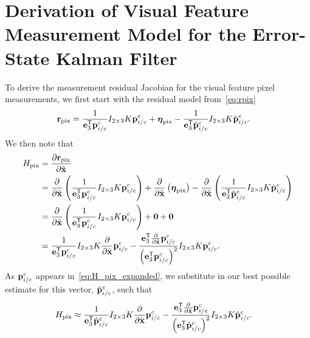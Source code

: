 \section{Derivation of Visual Feature Measurement Model for the Error-State Kalman Filter}
\label{apdx:estimation_pixel_meas_model}

To derive the measurement residual Jacobian for the visual feature pixel measurements, we
first start with the residual model from~\eqref{eq:rpix}
\begin{align}
  \boldsymbol{\mathrm{r}}_{\text{pix}}
  &= \frac{1}{\boldsymbol{\mathrm{e}}_3^{\mathsf{T}} \boldsymbol{\mathrm{p}}_{i/c}^c} I_{2 \times 3} K
  \boldsymbol{\mathrm{p}}_{i/c}^c + \boldsymbol{\mathrm{\eta}}_{\text{pix}} - \frac{1}{\boldsymbol{\mathrm{e}}_3^{\mathsf{T}} \hat{\boldsymbol{\mathrm{p}}}_{i/c}^c} I_{2 \times 3} K
  \hat{\boldsymbol{\mathrm{p}}}_{i/c}^c.
\end{align}
We then note that
\begin{align}
  H_{\text{pix}} &= \frac{ \partial \vect{r}_{\text{pix}} }{ \partial \tilde{\x}
  } \\
         &= \frac{ \partial }{ \partial \tilde{\x}}
         \left( \frac{1}{\e_3^\transpose \vect{p}_{i/c}^c} I_{2 \times 3} K
         \vect{p}_{i/c}^c \right) + \frac{ \partial }{ \partial \tilde{\x}}
         \left( \vect{\eta}_{\text{pix}} \right) - \frac{ \partial }{ \partial
           \tilde{\x}} \left( \frac{1}{\e_3^\transpose \hat{\vect{p}}_{i/c}^c} I_{2 \times 3} K
         \hat{\vect{p}}_{i/c}^c \right) \\
         &= \frac{ \partial }{ \partial \tilde{\x}}
         \left( \frac{1}{\e_3^\transpose \vect{p}_{i/c}^c} I_{2 \times 3} K
         \vect{p}_{i/c}^c \right) + \vect{0} + \vect{0} \\
          &= 
         \frac{1}{\e_3^\transpose \vect{p}_{i/c}^c} I_{2 \times 3} K
         \frac{\partial}{\partial \tilde{\x}} \vect{p}_{i/c}^c 
         - \frac{\e_3^\transpose \frac{\partial}{\partial \tilde{\x}} 
         \vect{p}_{i/c}^c}{\left( \e_3^\transpose
         \vect{p}_{i/c}^c \right)^2 } I_{2 \times 3} K
          \vect{p}_{i/c}^c. 
          \label{eq:H_pix_expanded}
\end{align}
As $\boldsymbol{\mathrm{p}}_{i/c}^c$ appears in~\eqref{eq:H_pix_expanded}, we substitute in our
best possible estimate for this vector, $\hat{\boldsymbol{\mathrm{p}}}_{i/c}^c$, such that
\begin{align}
  H_{\text{pix}} 
  &\approx
  \frac{1}{\boldsymbol{\mathrm{e}}_3^{\mathsf{T}} \hat{\boldsymbol{\mathrm{p}}}_{i/c}^c} I_{2 \times 3} K
 \frac{\partial}{\partial \tilde{\boldsymbol{\mathrm{x}}}} \boldsymbol{\mathrm{p}}_{i/c}^c 
 - \frac{\boldsymbol{\mathrm{e}}_3^{\mathsf{T}} \frac{\partial}{\partial \tilde{\boldsymbol{\mathrm{x}}}} 
 \boldsymbol{\mathrm{p}}_{i/c}^c}{\left( \boldsymbol{\mathrm{e}}_3^{\mathsf{T}}
 \hat{\boldsymbol{\mathrm{p}}}_{i/c}^c \right)^2 } I_{2 \times 3} K
 \hat{\boldsymbol{\mathrm{p}}}_{i/c}^c. 
\end{align}

